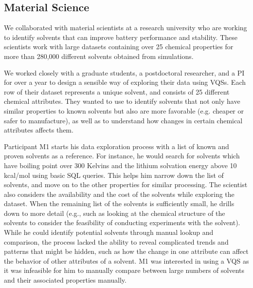 \subsection{Material Science}
\par We collaborated with material scientists at a research university who are working to identify solvents that can improve battery performance and stability. These scientists work with large datasets containing over 25 chemical properties for more than 280,000 different solvents obtained from simulations.
\par We worked closely with a graduate students, a postdoctoral researcher, and a PI for over a year to design a sensible way of exploring their data using VQSs. Each row of their dataset represents a unique solvent, and consists of 25 different chemical attributes. They wanted to use \zv to identify solvents that not only have similar properties to known solvents but also are more favorable (e.g. cheaper or safer to manufacture), as well as to understand how changes in certain chemical attributes affects them.
\par Participant M1 starts his data exploration process with a list of known and proven solvents as a reference. For instance, he would search for solvents which have boiling point over 300 Kelvins and the lithium solvation energy above 10 kcal/mol using basic SQL queries. This helps him narrow down the list of solvents, and move on to the other properties for similar processing. The scientist also considers the availability and the cost of the solvents while exploring the dataset. When the remaining list of the solvents is sufficiently small, he drills down to more detail (e.g., such as looking at the chemical structure of the solvents to consider the feasibility of conducting experiments with the solvent). While he could identify potential solvents through  manual lookup and comparison,  the process lacked the ability to reveal complicated trends and patterns that might be hidden, such as how the change in one attribute can affect the behavior of other attributes of a solvent. M1 was interested in using a VQS as it was infeasible for him to manually compare between large numbers of solvents and their associated properties manually.


